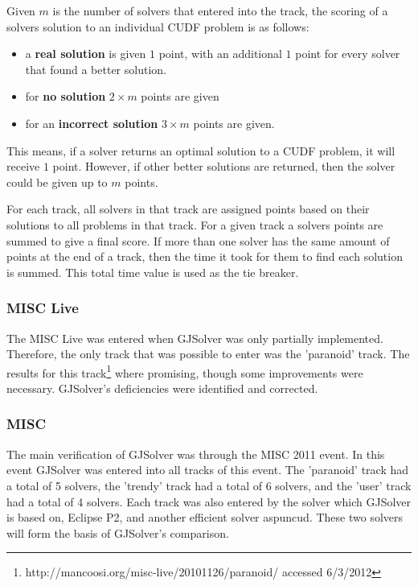 Given $m$ is the number of solvers that entered into the track, the scoring of a solvers solution to an individual CUDF problem is as follows:
\begin{itemize}
  \item a \textbf{real solution} is given $1$ point, with an additional $1$ point for every solver that found a better solution.
  \item for \textbf{no solution} $2\times m$ points are given
  \item for an \textbf{incorrect solution} $3 \times m$ points are given.
\end{itemize}
This means, if a solver returns an optimal solution to a CUDF problem, it will receive $1$ point.
However, if other better solutions are returned, then the solver could be given up to $m$ points.

For each track, all solvers in that track are assigned points based on their solutions to all problems in that track.
For a given track a solvers points are summed to give a final score.
If more than one solver has the same amount of points at the end of a track, then the time it took for them to find each solution is summed.
This total time value is used as the tie breaker.

\subsubsection{MISC Live}
The MISC Live was entered when GJSolver was only partially implemented.
Therefore, the only track that was possible to enter was the 'paranoid' track.
The results for this track\footnote{http://mancoosi.org/misc-live/20101126/paranoid/ accessed 6/3/2012} where promising, though some improvements were necessary.
GJSolver's deficiencies were identified and corrected.

\subsubsection{MISC}
The main verification of GJSolver was through the MISC 2011 event.
In this event GJSolver was entered into all tracks of this event.
The 'paranoid' track had a total of 5 solvers, the 'trendy' track had a total of 6 solvers, 
and the 'user' track had a total of 4 solvers.
Each track was also entered by the solver which GJSolver is based on, Eclipse P2, and another efficient solver aspuncud.
These two solvers will form the basis of GJSolver's comparison.

